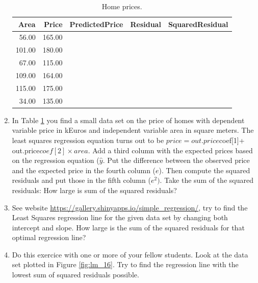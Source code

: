 \documentclass[]{book}\usepackage[]{graphicx}\usepackage[]{color}
\newenvironment{knitrout}{}{} %
\begin{document}
\begin{enumerate}



\begin{table}[ht]
\centering
\caption{Home prices.} 
\label{tab:lm_15}
\begin{tabular}{rrlll}
  \hline
Area & Price & PredictedPrice & Residual & SquaredResidual \\ 
  \hline
56.00 & 165.00 &   &   &   \\ 
  101.00 & 180.00 &   &   &   \\ 
  67.00 & 115.00 &   &   &   \\ 
  109.00 & 164.00 &   &   &   \\ 
  115.00 & 175.00 &   &   &   \\ 
  34.00 & 135.00 &   &   &   \\ 
   \hline
\end{tabular}
\end{table}


\item In Table \ref{tab:lm_15} you find a small data set on the price of homes with dependent variable price in kEuros and independent variable area in square meters. The least squares regression equation turns out to be $price = out.price$coef[1]+ out.price$coef[2]\times area$. Add a third column with the expected prices based on the regression equation ($\hat{y}$. Put the difference between the observed price and the expected price in the fourth column ($e$). Then compute the squared residuals and put those in the fifth column ($e^2)$. Take the sum of the squared residuals: How large is sum of the squared residuals?


\item See website \url{https://gallery.shinyapps.io/simple_regression/}, try to find the Least Squares regression line for the given data set by changing both intercept and slope. How large is the sum of the squared residuals for that optimal regression line?


\item Do this exercice with one or more of your fellow students. Look at the data set plotted in Figure \ref{fig:lm_16}. Try to find the regression line with the lowest sum of squared residuals possible.

\begin{knitrout}
\color{fgcolor}\begin{figure}


\end{figure}
\end{knitrout}
\end{enumerate}
\end{document}
